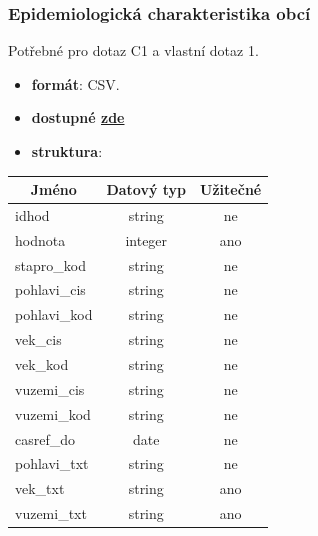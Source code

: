 \documentclass[12pt]{article}
\begin{document}
\subsubsection*{Epidemiologická charakteristika obcí}        
Potřebné pro dotaz C1 a vlastní dotaz 1.
\begin{itemize}
    \item \textbf{formát}: CSV.
    \item \textbf{dostupné  \href{https://www.czso.cz/documents/62353418/143522504/130142-21data043021.csv/760fab9c-d079-4d3a-afed-59cbb639e37d?version=1.1}{zde}}
    \item \textbf{struktura}:
\end{itemize}
        \begin{center}
            \begin{tabular}{ |l|c|c| } 
                \hline
                \multicolumn{1}{|c|}{Jméno} & Datový typ & Užitečné \\
                \hline
                \hline
                idhod & string & ne \\ 
                \hline
                hodnota & integer & ano \\ 
                \hline
                stapro\_kod & string & ne \\ 
                \hline
                pohlavi\_cis & string & ne \\ 
                \hline
                pohlavi\_kod & string & ne \\ 
                \hline
                vek\_cis & string & ne \\ 
                \hline
                vek\_kod & string & ne \\ 
                \hline
                vuzemi\_cis & string & ne \\ 
                \hline
                vuzemi\_kod & string & ne \\ 
                \hline
                casref\_do & date & ne \\ 
                \hline
                pohlavi\_txt & string & ne \\ 
                \hline
                vek\_txt & string & ano \\ 
                \hline
                vuzemi\_txt & string & ano \\ 
                \hline
            \end{tabular}
        \end{center} 
\end{document}

